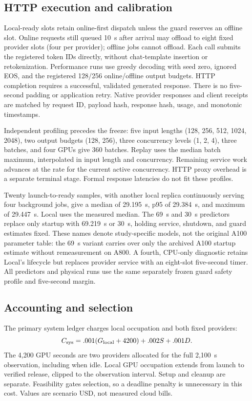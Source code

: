 \subsection{HTTP execution and calibration}
Local-ready slots retain online-first dispatch unless the guard reserves an offline slot. Online requests still queued
10~s after arrival may offload to eight fixed provider slots (four per
provider); offline jobs cannot offload. Each call submits the registered token
IDs directly, without chat-template insertion or retokenization. Performance
runs use greedy decoding with seed zero, ignored EOS, and the registered
128/256 online/offline output budgets. HTTP completion requires a successful,
validated generated response. There is no five-second padding or application
retry. Native provider responses and client receipts are matched by request
ID, payload hash, response hash, usage, and monotonic timestamps.

Independent profiling precedes the freeze: five input lengths
(128, 256, 512, 1024, 2048), two output budgets (128, 256), three concurrency
levels (1, 2, 4), three batches, and four GPUs give 360 batches. Replay uses
the median batch maximum, interpolated in input length and concurrency.
Remaining service work advances at the rate for the current active
concurrency. HTTP proxy overhead is a separate terminal stage. Formal response
latencies do not fit these profiles.

Twenty launch-to-ready samples, with another local replica continuously
serving four background jobs, give a median of 29.195~s, p95 of 29.384~s,
and maximum of 29.447~s. Local uses the measured median. The 69~s and 30~s
predictors replace only startup with 69.219~s or 30~s, holding service,
shutdown, and guard estimates fixed. These names denote study-specific
models, not the original A100 parameter table: the 69~s variant carries over
only the archived A100 startup estimate without remeasurement on A800.
A fourth, CPU-only diagnostic
retains Local's lifecycle but replaces provider service with an eight-slot
five-second timer. All predictors and physical runs use the same separately
frozen guard safety profile and five-second margin.

\subsection{Accounting and selection}
The primary system ledger charges local occupation and both fixed providers:
\begin{equation}
 C_{\rm sys}=.001(G_{\rm local}+4200)+.002S+.001D.
\end{equation}
The 4,200 GPU seconds are two providers allocated for the full 2,100~s
observation, including when idle. Local GPU occupation extends from launch to
verified release, clipped to the observation interval. Setup and cleanup are
separate. Feasibility gates selection, so a deadline penalty is unnecessary
in this cost. Values are scenario USD, not measured cloud bills.

